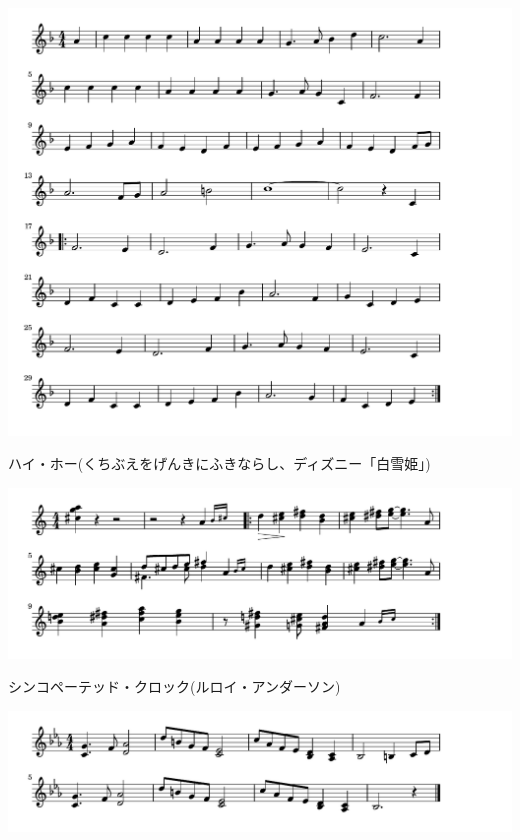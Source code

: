 \documentclass[a4paper]{ltjsarticle}
\begin{document}
\includegraphics[clip]{heighho_crop.pdf}

\vspace{-10mm} \hspace{10mm}
ハイ・ホー(くちぶえをげんきにふきならし、ディズニー「白雪姫」)

\includegraphics[clip]{syncopatedclock_crop.pdf}

\vspace{-10mm} \hspace{10mm}
シンコペーテッド・クロック(ルロイ・アンダーソン)

\includegraphics[clip]{honesty_crop.pdf}
\end{document}
